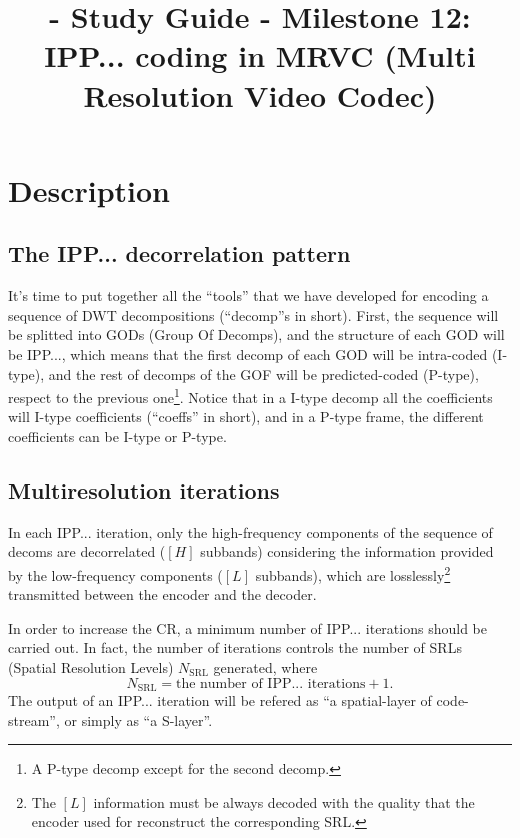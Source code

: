 
\title{\SM{} - Study Guide - Milestone 12: IPP... coding in MRVC (Multi Resolution Video Codec)}

\maketitle

\section{Description}

\subsection{The IPP... decorrelation pattern}
It's time to put together all the ``tools'' that we have developed for
encoding a sequence of DWT decompositions (``decomp''s in
short). First, the sequence will be splitted into GODs (Group Of
Decomps), and the structure of each GOD will be IPP..., which means
that the first decomp of each GOD will be intra-coded (I-type), and
the rest of decomps of the GOF will be predicted-coded (P-type),
respect to the previous one\footnote{A P-type decomp except for the
second decomp.}. Notice that in a I-type decomp all the coefficients
will I-type coefficients (``coeffs'' in short), and in a P-type frame,
the different coefficients can be I-type or P-type.

\subsection{Multiresolution iterations}
In each IPP... iteration, only the high-frequency components of the
sequence of decoms are decorrelated ($[H]$ subbands) considering the
information provided by the low-frequency components ($[L]$ subbands),
which are losslessly\footnote{The $[L]$ information must be always
decoded with the quality that the encoder used for reconstruct the
corresponding SRL.} transmitted between the encoder and the decoder.

In order to increase the CR, a minimum number of IPP... iterations
should be carried out. In fact, the number of iterations controls the
number of SRLs (Spatial Resolution Levels) $N_{\text{SRL}}$ generated,
where
\begin{equation}
  N_{\text{SRL}} = \text{the number of IPP... iterations} + 1.
\end{equation}
The output of an IPP... iteration will be refered as ``a
spatial-layer of code-stream'', or simply as ``a S-layer''.

